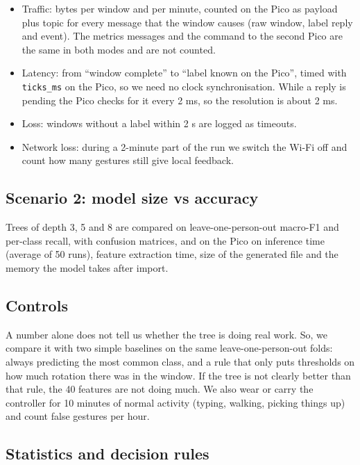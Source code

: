 \documentclass{article}
\begin{document}
\begin{itemize}
\item Traffic: bytes per window and per minute, counted on the Pico as payload plus topic for every message that the window causes (raw window, label reply and event). The metrics messages and the command to the second Pico are the same in both modes and are not counted.
\item Latency: from ``window complete'' to ``label known on the Pico'', timed with \texttt{ticks\_ms} on the Pico, so we need no clock synchronisation. While a reply is pending the Pico checks for it every 2 ms, so the resolution is about 2 ms.
\item Loss: windows without a label within 2 s are logged as timeouts.
\item Network loss: during a 2-minute part of the run we switch the Wi-Fi off and count how many gestures still give local feedback.
\end{itemize}

\subsection{Scenario 2: model size vs accuracy}

Trees of depth 3, 5 and 8 are compared on leave-one-person-out macro-F1 and per-class recall, with confusion matrices, and on the Pico on inference time (average of 50 runs), feature extraction time, size of the generated file and the memory the model takes after import.

\subsection{Controls}

A number alone does not tell us whether the tree is doing real work. So, we compare it with two simple baselines on the same leave-one-person-out folds: always predicting the most common class, and a rule that only puts thresholds on how much rotation there was in the window. If the tree is not clearly better than that rule, the 40 features are not doing much. We also wear or carry the controller for 10 minutes of normal activity (typing, walking, picking things up) and count false gestures per hour.

\subsection{Statistics and decision rules}
\end{document}
